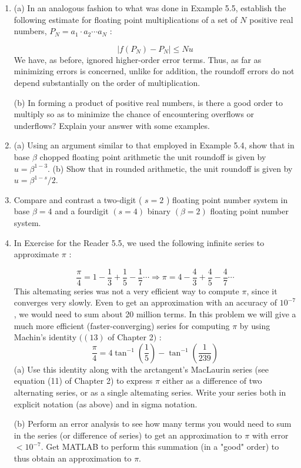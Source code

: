 \documentclass[../main.tex]{subfiles}
\begin{document}
\begin{enumerate}
\item (a) In an analogous fashion to what was done in Example 5.5, establish the following estimate for floating point multiplications of a set of $N$ positive real numbers, $P_{N}=a_{1} \cdot a_{2} \cdots a_{N}$ :

$$
\left|f\left(P_{N}\right)-P_{N}\right| \leq N u
$$
We have, as before, ignored higher-order error terms. Thus, as far as minimizing errors is concerned, unlike for addition, the roundoff errors do not depend substantially on the order of multiplication.

(b) In forming a product of positive real numbers, is there a good order to multiply so as to minimize the chance of encountering overflows or underflows? Explain your answer with some examples.

\item (a) Using an argument similar to that employed in Example 5.4, show that in base $\beta$ chopped floating point arithmetic the unit roundoff is given by $u=\beta^{1-3}$.
(b) Show that in rounded arithmetic, the unit roundoff is given by $u=\beta^{1-s} / 2$.

\item Compare and contrast a two-digit ( $s=2$ ) floating point number system in base $\beta=4$ and a fourdigit $(s=4)$ binary $(\beta=2)$ floating point number system.

\item In Exercise for the Reader 5.5, we used the following infinite series to approximate $\pi$ :

$$
\frac{\pi}{4}=1-\frac{1}{3}+\frac{1}{5}-\frac{1}{7} \cdots \Rightarrow \pi=4-\frac{4}{3}+\frac{4}{5}-\frac{4}{7} \cdots
$$
This altemating series was not a very efficient way to compute $\pi$, since it converges very slowly. Even to get an approximation with an accuracy of $10^{-7}$, we would need to sum about 20 million terms. In this problem we will give a much more efficient (faster-converging) series for computing $\pi$ by using Machin's identity $((13)$ of Chapter 2$)$ :
$$
\frac{\pi}{4}=4 \tan ^{-1}\left(\frac{1}{5}\right)-\tan ^{-1}\left(\frac{1}{239}\right)
$$
(a) Use this identity along with the arctangent's MacLaurin series (see equation (11) of Chapter 2) to express $\pi$ either as a difference of two alternating series, or as a single altemating series. Write your series both in explicit notation (as above) and in sigma notation.

(b) Perform an error analysis to see how many terms you would need to sum in the series (or difference of series) to get an approximation to $\pi$ with error $<10^{-7}$. Get MATLAB to perform this summation (in a "good" order) to thus obtain an approximation to $\pi$.


\end{enumerate}
\end{document}
